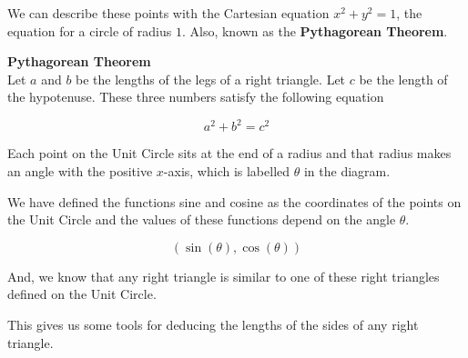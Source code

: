\documentclass{ximera}
\begin{document}
We can describe these points with the Cartesian equation $x^2 + y^2 = 1$, the equation for a circle of radius $1$. Also, known as the \textbf{Pythagorean Theorem}.\\



\begin{theorem}   \textbf{\textcolor{green!50!black}{Pythagorean Theorem}} \\

Let $a$ and $b$ be the lengths of the legs of a right triangle. Let $c$ be the length of the hypotenuse. These three numbers satisfy the following equation

\[
a^2 + b^2 = c^2
\]

\end{theorem}




Each point on the Unit Circle sits at the end of a radius and that radius makes an angle with the positive $x$-axis, which is labelled $\theta$ in the diagram.




We have defined the functions sine and cosine as the coordinates of the points on the Unit Circle and the values of these functions depend on the angle $\theta$.

\[    ( \sin(\theta), \cos(\theta) ) \]




And, we know that any right triangle is similar to one of these right triangles defined on the Unit Circle.


This gives us some tools for deducing the lengths of the sides of any right triangle.
\end{document}
